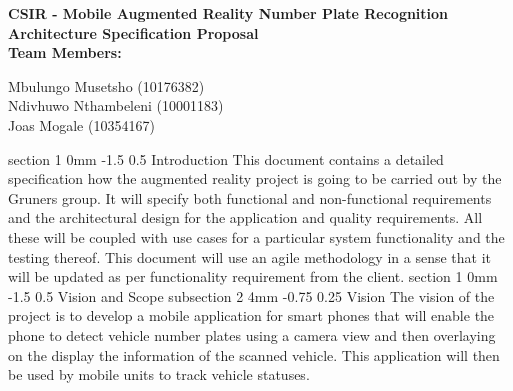 \documentclass[12pt]{article}
\makeatletter
\newcommand{\Title}{CSIR - Mobile Augmented Reality Number Plate Recognition} %
\renewcommand{\section}{\@startsection
   {section}%
   {1}%
   {0mm}%
   {-1.5\baselineskip}%
   {0.5\baselineskip}%
   {\sffamily\bfseries\upshape\normalsize}}%
\renewcommand{\subsection}{\@startsection
   {subsection}%
   {2}%
   {4mm}%
   {-0.75\baselineskip}%
   {0.25\baselineskip}%
   {\rmfamily\normalfont\scshape\normalsize}}%
\makeatother
\begin{document}
        \vspace{4em}
        
        \begin{center}%
        
          \LARGE \bf \Title \\[4em]
          \LARGE {\bf Architecture Specification Proposal}\\[1em]
          \LARGE {\bf Team Members:}\\[2em]
          \large
          
             Mbulungo Musetsho                          (10176382)  \\[1em]
             Ndivhuwo Nthambeleni 						(10001183)	\\[1em]
             Joas Mogale 								(10354167)	\\[1em]
            
        \end{center}%
        

        \newpage
        \tableofcontents    
                \newpage
                \section{Introduction}
                		This document contains a detailed specification how the augmented reality project is going to be carried out by the Gruners group. It will specify both functional and non-functional requirements and the architectural design for the application and quality requirements. All these will be coupled with use cases for a particular system functionality and the testing thereof. This document will use an agile methodology in a sense that it will be updated as per functionality requirement from the client. 
                \section{Vision and Scope}
                		\subsection{Vision}
                				The vision of the project is to develop a mobile application for smart phones that will enable the phone to detect vehicle number plates using a camera view and then overlaying on the display the information of the scanned vehicle. This application will then be used by mobile units to track vehicle statuses. 
\end{document}
